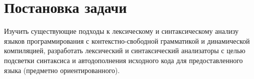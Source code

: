 \chapter{Постановка задачи} \label{chapt2}

Изучить существующие подходы к лексическому и синтаксическому анализу языков программирования с контекстно-свободной грамматикой и динамической компиляцией, разработать лексический и синтаксический анализаторы с целью подсветки синтаксиса и автодополнения исходного кода для предоставленного языка (предметно ориентированного).